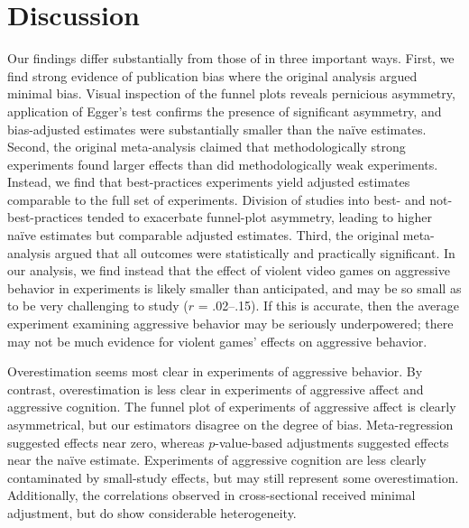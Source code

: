 \documentclass[man, mask]{apa6}
\begin{document}
\section{Discussion}
Our findings differ substantially from those of \citet{Anderson:etal:2010} in three important ways. First, we find strong evidence of publication bias where the original analysis argued minimal bias. Visual inspection of the funnel plots reveals pernicious asymmetry, application of Egger's test confirms the presence of significant asymmetry, and bias-adjusted estimates were substantially smaller than the na{\"i}ve estimates. Second, the original meta-analysis claimed that methodologically strong experiments found larger effects than did methodologically weak experiments. Instead, we find that best-practices experiments yield adjusted estimates comparable to the full set of experiments. Division of studies into best- and not-best-practices tended to exacerbate funnel-plot asymmetry, leading to higher na{\"i}ve estimates but comparable adjusted estimates.  
Third, the original meta-analysis argued that all outcomes were statistically and practically significant. In our analysis, we find instead that the effect of violent video games on aggressive behavior in experiments is likely smaller than anticipated, and may be so small as to be very challenging to study ($r$ = .02--.15). If this is accurate, then the average experiment examining aggressive behavior may be seriously underpowered; there may not be much evidence for violent games' effects on aggressive behavior. 

Overestimation seems most clear in experiments of aggressive behavior. By contrast, overestimation is less clear in experiments of aggressive affect and aggressive cognition. The funnel plot of experiments of aggressive affect is clearly asymmetrical, but our estimators disagree on the degree of bias. Meta-regression suggested effects near zero, whereas $p$-value-based adjustments suggested effects near the na{\"i}ve estimate. Experiments of aggressive cognition are less clearly contaminated by small-study effects, but may still represent some overestimation. Additionally, the correlations observed in cross-sectional received minimal adjustment, but do show considerable heterogeneity. 
 
\end{document}
